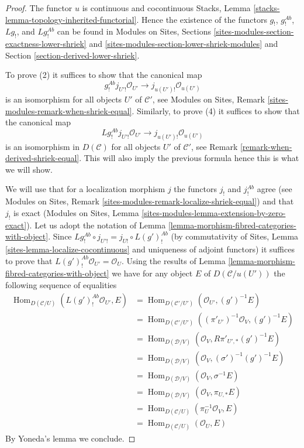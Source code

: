 \documentclass[10pt,a4paper]{amsart}
\theoremstyle{plain}
\theoremstyle{definition}
\theoremstyle{remark}
\numberwithin{equation}{subsection}
\def\Hom{\mathop{\mathrm{Hom}}\nolimits}
\begin{document}
\begin{proof}
The functor $u$ is continuous and cocontinuous
Stacks, Lemma \ref{stacks-lemma-topology-inherited-functorial}.
Hence the existence of the functors $g_!$, $g_!^{\textit{Ab}}$,
$Lg_!$, and $Lg_!^{\textit{Ab}}$ can be found in
Modules on Sites, Sections
\ref{sites-modules-section-exactness-lower-shriek} and
\ref{sites-modules-section-lower-shriek-modules}
and
Section \ref{section-derived-lower-shriek}.

\medskip\noindent
To prove (2) it suffices to show that the canonical map
$$
g_!^{\textit{Ab}}j_{U'!}\mathcal{O}_{U'} \to j_{u(U')!}\mathcal{O}_{u(U')}
$$
is an isomorphism for all objects $U'$ of $\mathcal{C}'$, see
Modules on Sites, Remark \ref{sites-modules-remark-when-shriek-equal}.
Similarly, to prove (4) it suffices to show that the canonical map
$$
Lg_!^{\textit{Ab}}j_{U'!}\mathcal{O}_{U'} \to j_{u(U')!}\mathcal{O}_{u(U')}
$$
is an isomorphism in $D(\mathcal{C})$ for all objects $U'$ of
$\mathcal{C}'$, see Remark \ref{remark-when-derived-shriek-equal}.
This will also imply the previous formula hence this is what we will show.

\medskip\noindent
We will use that for a localization morphism $j$ the
functors $j_!$ and $j_!^{\textit{Ab}}$ agree (see
Modules on Sites, Remark \ref{sites-modules-remark-localize-shriek-equal})
and that $j_!$ is exact
(Modules on Sites, Lemma \ref{sites-modules-lemma-extension-by-zero-exact}).
Let us adopt the notation of
Lemma \ref{lemma-morphism-fibred-categories-with-object}.
Since $Lg_!^{\textit{Ab}} \circ j_{U'!} = j_{U!} \circ L(g')^{\textit{Ab}}_!$
(by commutativity of Sites, Lemma \ref{sites-lemma-localize-cocontinuous}
and uniqueness of adjoint functors) it suffices to prove that
$L(g')^{\textit{Ab}}_!\mathcal{O}_{U'} = \mathcal{O}_U$. Using the
results of
Lemma \ref{lemma-morphism-fibred-categories-with-object}
we have for any object $E$ of $D(\mathcal{C}/u(U'))$ the following
sequence of equalities
\begin{align*}
\Hom_{D(\mathcal{C}/U)}(L(g')_!^{\textit{Ab}}\mathcal{O}_{U'}, E)
& =
\Hom_{D(\mathcal{C}'/U')}(\mathcal{O}_{U'}, (g')^{-1}E) \\
& =
\Hom_{D(\mathcal{C}'/U')}((\pi'_{U'})^{-1}\mathcal{O}_V, (g')^{-1}E) \\
& =
\Hom_{D(\mathcal{D}/V)}(\mathcal{O}_V, R\pi'_{U', *}(g')^{-1}E) \\
& =
\Hom_{D(\mathcal{D}/V)}(\mathcal{O}_V, (\sigma')^{-1}(g')^{-1}E) \\
& =
\Hom_{D(\mathcal{D}/V)}(\mathcal{O}_V, \sigma^{-1}E) \\
& =
\Hom_{D(\mathcal{D}/V)}(\mathcal{O}_V, \pi_{U, *}E) \\
& =
\Hom_{D(\mathcal{C}/U)}(\pi_U^{-1}\mathcal{O}_V, E) \\
& =
\Hom_{D(\mathcal{C}/U)}(\mathcal{O}_U, E)
\end{align*}
By Yoneda's lemma we conclude.
\end{proof}
\end{document}
